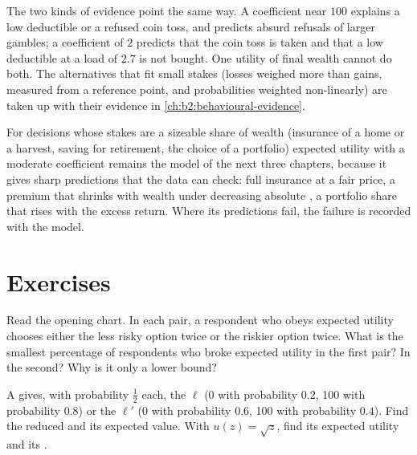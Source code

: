 The two kinds of evidence point the same way. A coefficient near $100$ explains a low deductible or a
refused coin toss, and predicts absurd refusals of larger gambles; a coefficient of $2$ predicts that
the coin toss is taken and that a low deductible at a load of $2.7$ is not bought. One utility of final
wealth cannot do both. The alternatives that fit small stakes (losses weighed more than gains, measured from a
reference point, and probabilities weighted non-linearly) are taken up with their evidence in
\cref{ch:b2:behavioural-evidence}.

\begin{remark}\label{rem:b2:expected-utility:kept}
For decisions whose stakes are a sizeable share of wealth (insurance of a home or a harvest, saving
for retirement, the choice of a portfolio) expected utility with a moderate coefficient remains the
model of the next three chapters, because it gives sharp predictions that the data can check: full
insurance at a fair price, a premium that shrinks with wealth under decreasing absolute ,
a portfolio share that rises with the excess return. Where its predictions fail, the failure is
recorded with the model.
\end{remark}

\section{Exercises}\label{sec:b2:expected-utility:exercises}

\begin{exercise}[$\star$]\label{exo:b2:expected-utility:1}
Read the opening chart. In each pair, a respondent who obeys expected utility chooses either the less
risky option twice or the riskier option twice. What is the smallest percentage of respondents who
broke expected utility in the first pair? In the second? Why is it only a lower bound?
\end{exercise}

\begin{exercise}[$\star$]\label{exo:b2:expected-utility:2}
A  gives, with probability $\tfrac12$ each, the  $\ell$ (0 with probability $0.2$,
\num{100} with probability $0.8$) or the  $\ell'$ (0 with probability $0.6$, \num{100} with
probability $0.4$). Find the reduced  and its expected value. With $u(z) = \sqrt z$, find its
expected utility and its .
\end{exercise}

